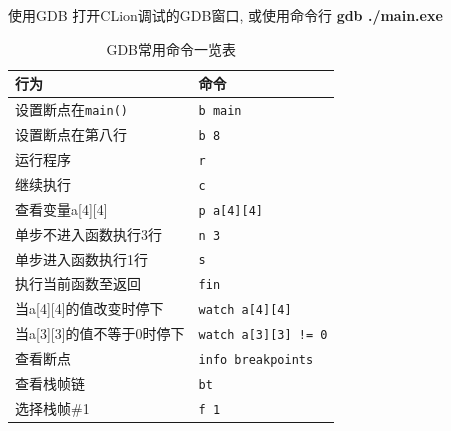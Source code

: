 \begin{frame}[fragile]{使用GDB}
    打开CLion调试的GDB窗口, 或使用命令行 \textbf{gdb ./main.exe}

    \begin{table}[]
        \begin{tabular}{|l|l|}
            \hline
            \textbf{行为} & \textbf{命令} \\ \hline
            设置断点在\texttt{main()} & \texttt{b main} \\ \hline
            设置断点在第八行 & \texttt{b 8} \\ \hline
            运行程序 & \texttt{r} \\ \hline
            继续执行 & \texttt{c} \\ \hline
            查看变量a[4][4] & \texttt{p a[4][4]} \\ \hline
            单步不进入函数执行3行 & \texttt{n 3} \\ \hline
            单步进入函数执行1行 & \texttt{s} \\ \hline
            执行当前函数至返回 & \texttt{fin} \\ \hline
            当a[4][4]的值改变时停下 & \texttt{watch a[4][4]} \\ \hline
            当a[3][3]的值不等于0时停下 & \texttt{watch a[3][3] != 0} \\ \hline
            查看断点 & \texttt{info breakpoints} \\ \hline
            查看栈帧链 & \texttt{bt} \\ \hline
            选择栈帧\#1 & \texttt{f 1} \\ \hline
        \end{tabular}
        \caption{GDB常用命令一览表}
    \end{table}
\end{frame}